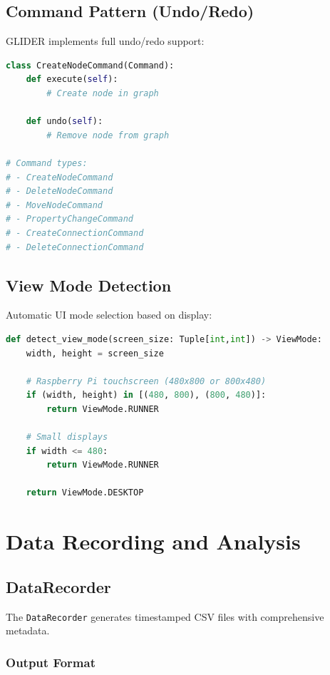 \documentclass[11pt,a4paper]{article}
\begin{document}
\subsection{Command Pattern (Undo/Redo)}

GLIDER implements full undo/redo support:

\begin{lstlisting}[language=Python]
class CreateNodeCommand(Command):
    def execute(self):
        # Create node in graph

    def undo(self):
        # Remove node from graph

# Command types:
# - CreateNodeCommand
# - DeleteNodeCommand
# - MoveNodeCommand
# - PropertyChangeCommand
# - CreateConnectionCommand
# - DeleteConnectionCommand
\end{lstlisting}

\subsection{View Mode Detection}

Automatic UI mode selection based on display:

\begin{lstlisting}[language=Python]
def detect_view_mode(screen_size: Tuple[int,int]) -> ViewMode:
    width, height = screen_size

    # Raspberry Pi touchscreen (480x800 or 800x480)
    if (width, height) in [(480, 800), (800, 480)]:
        return ViewMode.RUNNER

    # Small displays
    if width <= 480:
        return ViewMode.RUNNER

    return ViewMode.DESKTOP
\end{lstlisting}

\section{Data Recording and Analysis}

\subsection{DataRecorder}

The \texttt{DataRecorder} generates timestamped CSV files with comprehensive metadata.

\subsubsection{Output Format}
\end{document}
